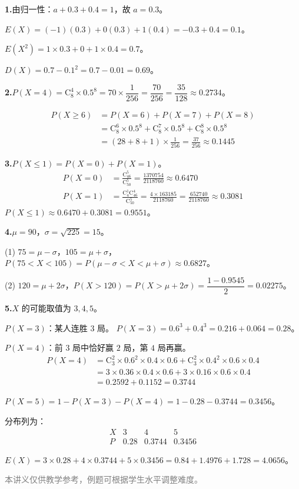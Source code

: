 \documentclass[12pt, a4paper]{ctexart}
\begin{document}
\begin{knowledgebox}[参考答案]
\textbf{1.}\quad 由归一性：$a + 0.3 + 0.4 = 1$，故 $a = 0.3$。

$E(X) = (-1)(0.3) + 0(0.3) + 1(0.4) = -0.3 + 0.4 = 0.1$。

$E(X^2) = 1 \times 0.3 + 0 + 1 \times 0.4 = 0.7$。

$D(X) = 0.7 - 0.1^2 = 0.7 - 0.01 = 0.69$。

\medskip
\textbf{2.}\quad $P(X=4) = \mathrm{C}_8^4 \times 0.5^8 = 70 \times \dfrac{1}{256} = \dfrac{70}{256} = \dfrac{35}{128} \approx 0.2734$。

\begin{align*}
P(X \geqslant 6) &= P(X=6) + P(X=7) + P(X=8) \\
&= \mathrm{C}_8^6 \times 0.5^8 + \mathrm{C}_8^7 \times 0.5^8 + \mathrm{C}_8^8 \times 0.5^8 \\
&= (28 + 8 + 1) \times \frac{1}{256} = \frac{37}{256} \approx 0.1445
\end{align*}

\medskip
\textbf{3.}\quad $P(X \leqslant 1) = P(X=0) + P(X=1)$。
\begin{align*}
P(X=0) &= \frac{\mathrm{C}_{46}^5}{\mathrm{C}_{50}^5} = \frac{1370754}{2118760} \approx 0.6470 \\[4pt]
P(X=1) &= \frac{\mathrm{C}_4^1 \mathrm{C}_{46}^4}{\mathrm{C}_{50}^5} = \frac{4 \times 163185}{2118760} = \frac{652740}{2118760} \approx 0.3081
\end{align*}
$P(X \leqslant 1) \approx 0.6470 + 0.3081 = 0.9551$。

\medskip
\textbf{4.}\quad $\mu = 90$，$\sigma = \sqrt{225} = 15$。

(1) $75 = \mu - \sigma$，$105 = \mu + \sigma$，$P(75 < X < 105) = P(\mu - \sigma < X < \mu + \sigma) \approx 0.6827$。

(2) $120 = \mu + 2\sigma$，$P(X > 120) = P(X > \mu + 2\sigma) = \dfrac{1 - 0.9545}{2} = 0.02275$。

\medskip
\textbf{5.}\quad $X$ 的可能取值为 $3, 4, 5$。

$P(X=3)$：某人连胜 $3$ 局。
$P(X=3) = 0.6^3 + 0.4^3 = 0.216 + 0.064 = 0.28$。

$P(X=4)$：前 $3$ 局中恰好赢 $2$ 局，第 $4$ 局再赢。
\begin{align*}
P(X=4) &= \mathrm{C}_3^2 \times 0.6^2 \times 0.4 \times 0.6 + \mathrm{C}_3^2 \times 0.4^2 \times 0.6 \times 0.4 \\
&= 3 \times 0.36 \times 0.4 \times 0.6 + 3 \times 0.16 \times 0.6 \times 0.4 \\
&= 0.2592 + 0.1152 = 0.3744
\end{align*}

$P(X=5) = 1 - P(X=3) - P(X=4) = 1 - 0.28 - 0.3744 = 0.3456$。

分布列为：
\[
\begin{array}{c|ccc}
X & 3 & 4 & 5 \\
\hline
P & 0.28 & 0.3744 & 0.3456
\end{array}
\]

$E(X) = 3 \times 0.28 + 4 \times 0.3744 + 5 \times 0.3456 = 0.84 + 1.4976 + 1.728 = 4.0656$。
\end{knowledgebox}

\vfill
\begin{center}
\small\textcolor{gray}{本讲义仅供教学参考，例题可根据学生水平调整难度。}
\end{center}
\end{document}
